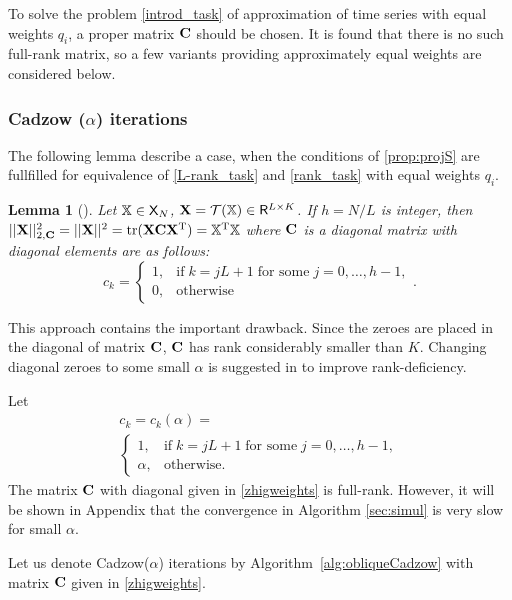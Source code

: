 \documentclass[sii]{ipart}
\DeclareMathOperator{\tr}{tr}
\newtheorem{lemma}{Lemma}
\begin{document}
To solve the problem \eqref{introd_task} of approximation of time series with equal weights $q_i$, a proper matrix $\mathbf{C}$ should be chosen. It is found that there is no such full-rank matrix, so a few variants providing approximately equal weights are considered below.

\subsubsection{Cadzow ($\alpha$) iterations}
\label{sec:cadzow_alpha}
The following lemma describe a case, when the conditions of \ref{prop:projS} are fullfilled for equivalence of \eqref{L-rank_task} and \eqref{rank_task} with equal weights $q_i$.
\begin{lemma}[\cite{Gillard2014}]
	\label{zhiglemma}
	Let $\mathbb{X} \in \mathsf{X}_N$, $\mathbf{X} = \mathcal{T}(\mathbb{X}) \in \mathsf{R}^{L \times K}$. If $h = N/L$ is integer, then $||\bfX||^2_{2, \bfC} = ||\bfX||^2 = \tr(\bfX \bfC \bfX^\rmT) = \tsX^\rmT \tsX$ where $\mathbf{C}$ is a diagonal matrix with diagonal elements are as follows:
	\begin{equation*}
	c_k = \begin{cases}
	1, & \text{if} \; k = jL+1 \;\text{for some} \; j = 0, \ldots, h-1, \\
	0, & \text{otherwise}
	\end{cases}.
	\end{equation*}
\end{lemma}

This approach contains the important drawback. Since the zeroes are placed in the diagonal of matrix $\mathbf{C}$, $\mathbf{C}$ has rank considerably smaller than $K$. Changing diagonal zeroes to some small $\alpha$ is suggested in \cite{Gillard2014} to improve rank-deficiency.

Let
\begin{multline}\label{zhigweights}
c_k = c_k(\alpha) =\\ \begin{cases}
1, & \text{if} \; k = jL+1 \; \text{for some} \; j = 0, \ldots, h-1, \\
\alpha, & \text{otherwise.}
\end{cases}
\end{multline}
The matrix $\mathbf{C}$ with diagonal given in \ref{zhigweights} is full-rank. However, it will be shown in Appendix that the convergence in Algorithm \ref{sec:simul} is very slow for small $\alpha$.

Let us denote Cadzow($\alpha$) iterations by Algorithm~\ref{alg:obliqueCadzow} with matrix $\mathbf{C}$  given in \eqref{zhigweights}.
\end{document}
